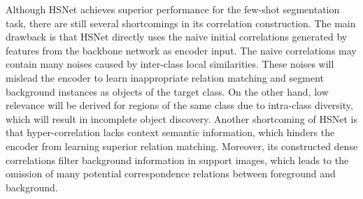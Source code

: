 \documentclass[journal]{IEEEtran}
\begin{document}
Although HSNet achieves superior performance for the few-shot segmentation task, there are still several shortcomings in its correlation construction. The main drawback is that HSNet directly uses the naive initial correlations generated by features from the backbone network as encoder input. The naive correlations may contain many noises caused by inter-class local similarities. These noises will mislead the encoder to learn inappropriate relation matching and segment background instances as objects of the target class. On the other hand, low relevance will be derived for regions of the same class due to intra-class diversity, which will result in incomplete object discovery. Another shortcoming of HSNet \cite{min2021hypercorrelation} is that hyper-correlation lacks context semantic information, which hinders the encoder from learning superior relation matching. Moreover, its constructed dense correlations filter background information in support images, which leads to the omission of many potential correspondence relations between foreground and background.\par
\end{document}
